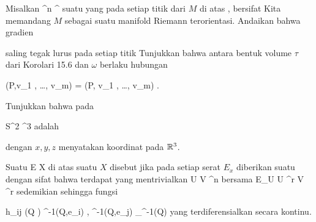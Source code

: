 {}
{

Misalkan
\maabbdisp {\varphi} {\R^n } {\R^\ell
} {}
 {} {}
suatu
yang pada setiap titik dari
$M$ di atas
\mathl{0 \in \R^\ell}{}, bersifat
Kita memandang $M$ sebagai suatu manifold Riemann terorientasi. Andaikan bahwa gradien

 {  }

saling tegak lurus pada setiap titik
 Tunjukkan bahwa antara bentuk volume $\tau$ dari
Korolari 15.6
dan
$\omega$ berlaku hubungan

\mavergleichskettedisp
{\vergleichskette
{\tau(P,v_1 , \ldots , v_m)
}
{ =} { \pm {} \Vert  \cdots {} \Vert \omega(P, v_1 , \ldots , v_m)
}
{ } {
}
{ } {
}
{ } {
}
}
{}{}{.}

}
{} {}

{}
{

Tunjukkan bahwa
pada

\mavergleichskette
{\vergleichskette
{S^2
}
{ \subset }{ \R^3
}
{  }{
}
{    }{
}
{   }{
}
}
{}{}{}
adalah

 {  }

dengan $x,y,z$ menyatakan koordinat pada ${\mathbb R}^3$.

}
{} {}

Suatu
 { E } { X
} {}
di atas suatu
$X$ disebut
jika pada setiap serat $E_x$ diberikan suatu
dengan sifat bahwa terdapat
yang mentrivialkan
\maabbdisp {\alpha} { U } { V \subseteq \R^n
} {}
bersama
\maabbdisp {\theta} {E\vert_U \cong U \times \R^r } { V \times \R^r
} {}
sedemikian sehingga fungsi

\mavergleichskettedisp
{\vergleichskette
{ h_{ij} (Q )
}
{ } { \left\langle  \theta^{-1}(Q,e_i)  , \theta^{-1}(Q,e_j)    \right\rangle_{\alpha^{-1}(Q)}
}
{ } {
}
{ } {
}
{ } {
}
}
{}{}{}
yang terdiferensialkan secara kontinu.

